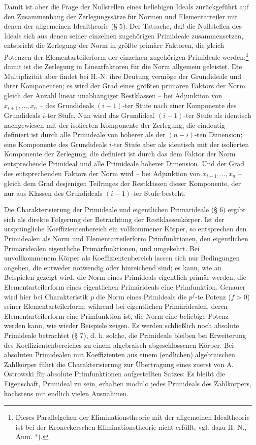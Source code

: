 \documentclass[11pt]{article}
\begin{document}
Damit ist aber die Frage der Nullstellen eines beliebigen Ideals zurückgeführt auf den Zusammenhang der Zerlegungssätze für Normen und Elementarteiler mit denen der allgemeinen Idealtheorie (§ 5). Der Tatsache, daß die Nullstellen des Ideals sich aus denen seiner einzelnen zugehörigen Primideale zusammensetzen, entspricht die Zerlegung der Norm in größte primäre Faktoren, die gleich Potenzen der Elementarteilerform der einzelnen zugehörigen Primideale werden;\footnote{Dieses Parallelgehen der Eliminationstheorie mit der allgemeinen Idealtheorie ist bei der Kroneckerschen Eliminationstheorie nicht erfüllt; vgl. dazu H.-N., Anm. *).} damit ist die Zerlegung in Linearfaktoren für die Norm allgemein geleistet. Die Multiplizität aber findet bei H.-N. ihre Deutung vermöge der Grundideale und ihrer Komponenten; es wird der Grad eines größten primären Faktors der Norm gleich der Anzahl linear unabhängiger Restklassen -- bei Adjunktion von $x_{i+1},\ldots,x_n$ -- des Grundideals $(i-1)$-ter Stufe nach einer Komponente des Grundideals $i$-ter Stufe. Nun wird das Grundideal $(i-1)$-ter Stufe als identisch nachgewiesen mit der isolierten Komponente der Zerlegung, die eindeutig definiert ist durch alle Primideale von höherer als der $(n-i)$-ten Dimension; eine Komponente des Grundideals $i$-ter Stufe aber als identisch mit der isolierten Komponente der Zerlegung, die definiert ist durch das dem Faktor der Norm entsprechende Primideal und alle Primideale höherer Dimension. Und der Grad des entsprechenden Faktors der Norm wird -- bei Adjunktion von $x_{i+1},\ldots,x_n$ -- gleich dem Grad desjenigen Teilringes der Restklassen dieser Komponente, der nur aus Klassen des Grundideals $(i-1)$-ter Stufe besteht.

Die Charakterisierung der Primideale und eigentlichen Primärideale (§ 6) ergibt sich als direkte Folgerung der Betrachtung der Restklassenkörper. Ist der ursprüngliche Koeffizientenbereich ein vollkommener Körper, so entsprechen den Primidealen als Norm und Elementarteilerform Primfunktionen, den eigentlichen Primäridealen eigentliche Primärfunktionen, und umgekehrt. Bei unvollkommenem Körper als Koeffizientenbereich lassen sich nur Bedingungen angeben, die entweder notwendig oder hinreichend sind; es kann, wie an Beispielen gezeigt wird, die Norm eines Primideals eigentlich primär werden, die Elementarteilerform eines eigentlichen Primärideals eine Primfunktion. Genauer wird hier bei Charakteristik $p$ die Norm eines Primideals die $p^f$-te Potenz ($f>0$) seiner Elementarteilerform; während bei eigentlichen Primäridealen, deren Elementarteilerform eine Primfunktion ist, die Norm eine beliebige Potenz werden kann, wie wieder Beispiele zeigen. Es werden schließlich noch absolute Primideale betrachtet (§ 7), d. h. solche, die Primideale bleiben bei Erweiterung des Koeffizientenbereiches zu einem algebraisch abgeschlossenen Körper. Bei absoluten Primidealen mit Koeffizienten aus einem (endlichen) algebraischen Zahlkörper führt die Charakterisierung zur Übertragung eines zuerst von A. Ostrowski für absolute Primfunktionen aufgestellten Satzes: Es bleibt die Eigenschaft, Primideal zu sein, erhalten modulo jedes Primideals des Zahlkörpers, höchstens mit endlich vielen Ausnahmen.
\end{document}
